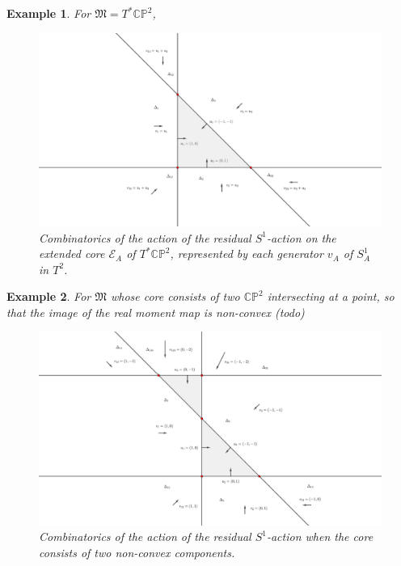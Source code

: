 \documentclass{article}
\newtheorem{example}{Example}
\newcommand{\PP}{\mathbb{P}}
\newcommand{\CC}{\mathbb{C}}
\newcommand{\mcE}{\mathcal{E}}
\newcommand{\mf}[1]{\mathfrak{#1}}
\begin{document}
	
	\begin{example}
		For $\mf{M} = T^{\ast}\CC\PP^{2}$,
		
		\begin{figure}[h!]
			\includegraphics[width=1\linewidth]{figures/T_CP2_combinatorics.pdf}
			\caption{Combinatorics of the action of the residual $S^{1}$-action on the extended core $\mcE_{A}$ of $T^{\ast}\CC\PP^{2}$, represented by each generator $v_{A}$ of $S_{A}^{1}$ in $T^{2}$.}
		\end{figure}
		
		
		
	\end{example}
	
	\begin{example}
		For $\mf{M}$ whose core consists of two $\CC\PP^{2}$ intersecting at a point, so that the image of the real moment map is non-convex (todo)
		
		\begin{figure}[h!]
			\includegraphics[width=1\linewidth]{figures/non-convex_combinatorics.pdf}
			\caption{Combinatorics of the action of the residual $S^{1}$-action when the core consists of two non-convex components.}
		\end{figure}
		
	\end{example}
\end{document}
